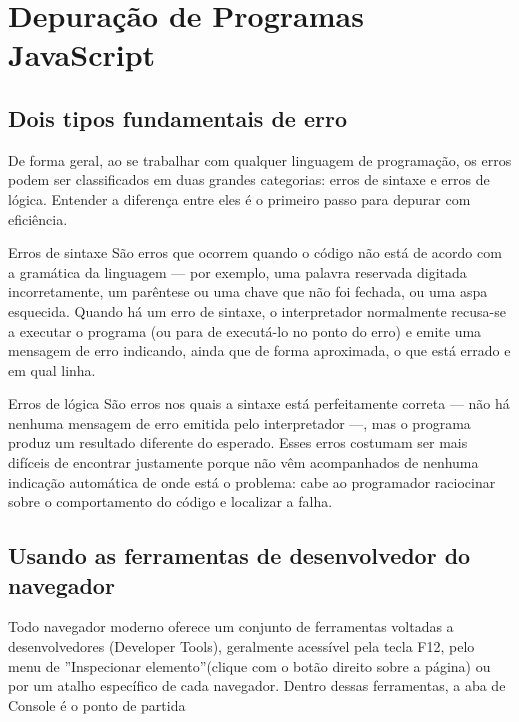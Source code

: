 \chapter{Depuração de Programas JavaScript}

\section{Dois tipos fundamentais de erro}

De forma geral, ao se trabalhar com qualquer linguagem de programação, os erros podem ser classificados em duas grandes categorias: erros de sintaxe e erros de lógica. Entender a diferença entre eles é o primeiro passo para depurar com eficiência.

\begin{infobox}{Erros de sintaxe}
São erros que ocorrem quando o código não está de acordo com a gramática da linguagem — por exemplo, uma palavra reservada digitada incorretamente, um parêntese ou uma chave que não foi fechada, ou uma aspa esquecida. Quando há um erro de sintaxe, o interpretador normalmente recusa-se a executar o programa (ou para de executá-lo no ponto do erro) e emite uma mensagem de erro indicando, ainda que de forma aproximada, o que está errado e em qual linha.
\end{infobox}

\begin{infobox}{Erros de lógica}
São erros nos quais a sintaxe está perfeitamente correta — não há nenhuma mensagem de erro emitida pelo interpretador —, mas o programa produz um resultado diferente do esperado. Esses erros costumam ser mais difíceis de encontrar justamente porque não vêm acompanhados de nenhuma indicação automática de onde está o problema: cabe ao programador raciocinar sobre o comportamento do código e localizar a falha.
\end{infobox}

\section{Usando as ferramentas de desenvolvedor do navegador}

Todo navegador moderno oferece um conjunto de ferramentas voltadas a desenvolvedores (Developer Tools), geralmente acessível pela tecla F12, pelo menu de ”Inspecionar elemento”(clique com o botão direito sobre a página) ou por um atalho específico de cada navegador. Dentro dessas ferramentas, a aba de Console é o ponto de partida

